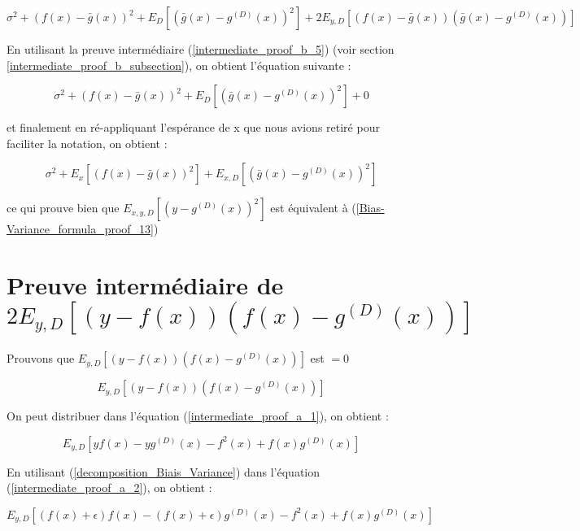 \documentclass[a4paper]{article}
\begin{document}
\begin{appendices}
	\begin{equation}
		\label{Bias-Variance_formula_proof_11}
		\sigma^2 + (f(x) -\bar{g}(x))^2 + E_{D} [(\bar{g}(x) - g^{(D)}(x))^2] + 2 E_{y,D} [(f(x) -\bar{g}(x)) (\bar{g}(x) - g^(D)(x))]
	\end{equation}
	
	En utilisant la preuve intermédiaire (\ref{intermediate_proof_b_5}) (voir section \ref{intermediate_proof_b_subsection}), on obtient l'équation suivante :
	
	\begin{equation}
		\label{Bias-Variance_formula_proof_12}
		\sigma^2 + (f(x) -\bar{g}(x))^2 + E_{D} [(\bar{g}(x) - g^{(D)}(x))^2] + 0
	\end{equation}
	
	et finalement en ré-appliquant l'espérance de x que nous avions retiré pour faciliter la notation, on obtient :
	
	\begin{equation}
		\label{Bias-Variance_formula_proof_13}
		\sigma^2 + E_x[(f(x) -\bar{g}(x))^2] + E_{x,D} [(\bar{g}(x) - g^{(D)}(x))^2]
	\end{equation}
	
	ce qui prouve bien que $ E_{x,y,D}[(y-g^{(D)}(x))^2] $ est équivalent à (\ref{Bias-Variance_formula_proof_13})
	\newpage
	
	\section{Preuve intermédiaire de $2E_{y,D} [(y-f(x)) (f(x) - g^{(D)}(x)) ]$}
	\label{intermediate_proof_a_subsection}
	Prouvons que $E_{y,D} [(y-f(x)) (f(x) - g^{(D)}(x)) ]$ est $= 0$ 
	
	\begin{equation}
		\label{intermediate_proof_a_1}
		E_{y,D} [(y-f(x)) (f(x) - g^{(D)}(x)) ]
	\end{equation}
	
	On peut distribuer dans l'équation (\ref{intermediate_proof_a_1}), on obtient :
	
	\begin{equation}
		\label{intermediate_proof_a_2}
		E_{y,D} [yf(x) -yg^{(D)}(x) - f^2(x) + f(x)g^{(D)}(x)]
	\end{equation}
	
	En utilisant (\ref{decomposition_Biais_Variance}) dans l'équation (\ref{intermediate_proof_a_2}), on obtient :
	
	\begin{equation}
		\label{intermediate_proof_a_3}
		E_{y,D} [(f(x) + \epsilon)f(x) -(f(x) + \epsilon)g^{(D)}(x) - f^2(x) + f(x)g^{(D)}(x)]
	\end{equation}
	

\end{appendices}
\end{document}
